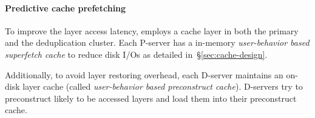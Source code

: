 \paragraph{Predictive cache prefetching}

To improve the layer access latency, \sysname employs a cache layer in both the
primary and the deduplication cluster.
%
Each P-server has a in-memory \emph{user-behavior based superfetch cache}
to reduce disk I/Os as detailed in~\S\ref{sec:cache-design}.

Additionally, to avoid layer restoring overhead,
each D-server maintains an on-disk layer cache (called \emph{user-behavior based preconstruct cache}).
D-servers try to preconstruct likely to be accessed layers and load them into their
preconstruct cache.

%
%
  


